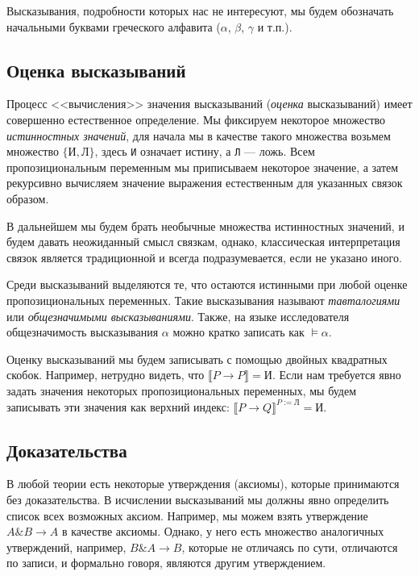 Высказывания, подробности
которых нас не интересуют, мы будем обозначать начальными буквами греческого алфавита
($\alpha$, $\beta$, $\gamma$ и т.п.).

\subsection{Оценка высказываний}

Процесс <<вычисления>> значения высказываний (\emph{оценка} высказываний) имеет совершенно
естественное определение. Мы фиксируем некоторое множество
\emph{истинностных значений}, для начала мы в качестве такого множества возьмем 
множество $\{\texttt{И}, \texttt{Л}\}$, здесь \texttt{И} означает истину, а
\texttt{Л} --- ложь. Всем пропозициональным переменным мы приписываем некоторое
значение, а затем рекурсивно вычисляем значение выражения естественным для указанных
связок образом.

В дальнейшем мы будем брать необычные множества истинностных значений, и будем давать
неожиданный смысл связкам, однако, классическая интерпретация связок является традиционной
и всегда подразумевается, если не указано иного.

Среди высказываний выделяются те, что остаются истинными при любой оценке пропозициональных
переменных. Такие высказывания называют \emph{тавталогиями} или \emph{общезначимыми высказываниями}.
Также, на языке исследователя общезначимость высказывания $\alpha$ можно кратко 
записать как $\models \alpha$. 

Оценку высказываний мы будем записывать с помощью двойных квадратных скобок. Например,
нетрудно видеть, что $\llbracket P \rightarrow P \rrbracket = \texttt{И}$.
Если нам требуется явно задать значения некоторых пропозициональных переменных, мы будем
записывать эти значения как верхний индекс: $\llbracket P \rightarrow Q \rrbracket ^ {P:=\texttt{Л}} = \texttt{И}$.

\subsection{Доказательства}

В любой теории есть некоторые утверждения (аксиомы), которые принимаются без доказательства.
В исчислении высказываний мы должны явно определить список всех возможных аксиом. 
Например, мы можем взять утверждение $A \& B \rightarrow A$ в качестве аксиомы.
Однако, у него есть множество аналогичных утверждений, например, $B \& A \rightarrow B$,
которые не отличаясь по сути, отличаются по записи, и формально говоря, являются другим
утверждением.

